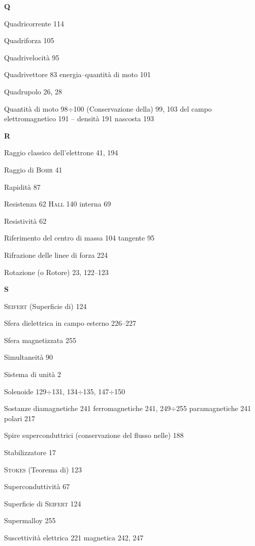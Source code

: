 \begin{theindex}
  \indexspace
  \item \textbf{Q}
  \indexspace
  \item Quadricorrente 114
  \item Quadriforza 105
  \item Quadrivelocit\`a 95
  \item Quadrivettore 83
    \subitem energia--quantit\`a di moto 101
  \item Quadrupolo 26, 28
  \item Quantit\`a di moto 98$\div$100
    \subitem (Conservazione della) 99, 103
    \subitem del campo elettromagnetico 191
    \subitem -- densit\`a 191
    \subitem nascosta 193

  \indexspace
  \item \textbf{R}
  \indexspace
  \item Raggio classico dell'elettrone 41, 194
  \item Raggio di \textsc{Bohr} 41
  \item Rapidit\`a 87
  \item Resistenza 62
    \subitem \textsc{Hall} 140
    \subitem interna 69
  \item Resistivit\`a 62
  \item Riferimento
    \subitem del centro di massa 104
    \subitem tangente 95
  \item Rifrazione delle linee di forza 224
  \item Rotazione (o Rotore) 23, 122--123

  \indexspace
  \item \textbf{S}
  \indexspace
  \item \textsc{Seifert} (Superficie di) 124
  \item Sfera dielettrica in campo esterno 226--227
  \item Sfera magnetizzata 255
  \item Simultaneit\`a 90
  \item Sistema di unit\`a 2
  \item Solenoide 129$\div$131, 134$\div$135, 147$\div$150
  \item Sostanze
    \subitem diamagnetiche 241
    \subitem ferromagnetiche 241, 249$\div$255
    \subitem paramagnetiche 241
    \subitem polari 217
  \item Spire superconduttrici (conservazione del flusso nelle) 188
  \item Stabilizzatore 17
  \item \textsc{Stokes} (Teorema di) 123
  \item Superconduttivit\`a 67
  \item Superficie di \textsc{Seifert} 124
  \item Supermalloy 255
  \item Suscettivit\`a
    \subitem elettrica 221
    \subitem magnetica 242, 247


\end{theindex}
